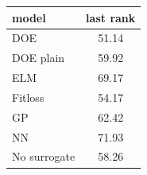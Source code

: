 \begin{tabular}{|lc|}
\hline
model & last rank\\
\hline
DOE & 51.14 \\
DOE plain & 59.92 \\
ELM & 69.17 \\
Fitloss & 54.17 \\
GP & 62.42 \\
NN & 71.93 \\
No surrogate & 58.26 \\
\hline
\end{tabular}
